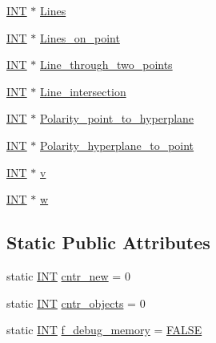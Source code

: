 \begin{DoxyCompactItemize}
\item 
\mbox{\hyperlink{galois_8h_a09fddde158a3a20bd2dcadb609de11dc}{I\+NT}} $\ast$ \mbox{\hyperlink{classprojective__space_a13b4aa186b917c8ccecd93ed89034af2}{Lines}}
\item 
\mbox{\hyperlink{galois_8h_a09fddde158a3a20bd2dcadb609de11dc}{I\+NT}} $\ast$ \mbox{\hyperlink{classprojective__space_aa4d18c4b9b51bd605b77b52959f1e5db}{Lines\+\_\+on\+\_\+point}}
\item 
\mbox{\hyperlink{galois_8h_a09fddde158a3a20bd2dcadb609de11dc}{I\+NT}} $\ast$ \mbox{\hyperlink{classprojective__space_ab5e1312a85c00b8a074e946b4b21f90e}{Line\+\_\+through\+\_\+two\+\_\+points}}
\item 
\mbox{\hyperlink{galois_8h_a09fddde158a3a20bd2dcadb609de11dc}{I\+NT}} $\ast$ \mbox{\hyperlink{classprojective__space_a83e3a27a23af523bc30ab2a57f87acf1}{Line\+\_\+intersection}}
\item 
\mbox{\hyperlink{galois_8h_a09fddde158a3a20bd2dcadb609de11dc}{I\+NT}} $\ast$ \mbox{\hyperlink{classprojective__space_aa41b85a103d042993884e7bff21e690b}{Polarity\+\_\+point\+\_\+to\+\_\+hyperplane}}
\item 
\mbox{\hyperlink{galois_8h_a09fddde158a3a20bd2dcadb609de11dc}{I\+NT}} $\ast$ \mbox{\hyperlink{classprojective__space_a2796b9c4dc2d0d5a4fb78d696366b590}{Polarity\+\_\+hyperplane\+\_\+to\+\_\+point}}
\item 
\mbox{\hyperlink{galois_8h_a09fddde158a3a20bd2dcadb609de11dc}{I\+NT}} $\ast$ \mbox{\hyperlink{classprojective__space_a127fffa4c5b0ce4e440bfc09fed5c12d}{v}}
\item 
\mbox{\hyperlink{galois_8h_a09fddde158a3a20bd2dcadb609de11dc}{I\+NT}} $\ast$ \mbox{\hyperlink{classprojective__space_af2cc6c48f25e83b456bc0a3fbbfcfb6c}{w}}
\end{DoxyCompactItemize}
\subsection*{Static Public Attributes}
\begin{DoxyCompactItemize}
\item 
static \mbox{\hyperlink{galois_8h_a09fddde158a3a20bd2dcadb609de11dc}{I\+NT}} \mbox{\hyperlink{classprojective__space_a9aa71c592e2ab69083b38b713e011e3f}{cntr\+\_\+new}} = 0
\item 
static \mbox{\hyperlink{galois_8h_a09fddde158a3a20bd2dcadb609de11dc}{I\+NT}} \mbox{\hyperlink{classprojective__space_a0cbb7d0c7ac186170c4f51e847c7072c}{cntr\+\_\+objects}} = 0
\item 
static \mbox{\hyperlink{galois_8h_a09fddde158a3a20bd2dcadb609de11dc}{I\+NT}} \mbox{\hyperlink{classprojective__space_add65237a18b78a482612ddb918bbb696}{f\+\_\+debug\+\_\+memory}} = \mbox{\hyperlink{nauty_8h_aa93f0eb578d23995850d61f7d61c55c1}{F\+A\+L\+SE}}
\end{DoxyCompactItemize}


